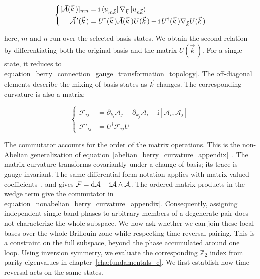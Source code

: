 \begin{equation}
\left\{\begin{aligned}
    [\vec{\mathcal{A}}(\vec{k}\,)]_{mn}
    &=\mathrm{i}\bra{u_{m\vec{k}}}\nabla_{\vec{k}}\ket{u_{n\vec{k}}} \\
    \vec{\mathcal{A}}\,'(\vec{k}\,)
    &=U^\dagger(\vec{k}\,)\vec{\mathcal{A}}(\vec{k}\,)U(\vec{k}\,)
    +\mathrm{i}\,U^\dagger(\vec{k}\,)\nabla_{\vec{k}}U(\vec{k}\,)
\end{aligned}\right.
\label{band_subspace_connection_topology}
\end{equation}

here, $m$ and $n$ run over the selected basis states.
We obtain the second relation by differentiating both the original basis and the matrix $U(\vec{k}\,)$.
For a single state, it reduces to equation~\eqref{berry_connection_gauge_transformation_topology}.
The off-diagonal elements describe the mixing of basis states as $\vec{k}$ changes.
The corresponding curvature is also a matrix:

\begin{equation}
\left\{\begin{aligned}
    \mathcal{F}_{ij}
    &=\partial_{k_i}\mathcal{A}_j-\partial_{k_j}\mathcal{A}_i
    -\mathrm{i}[\mathcal{A}_i,\mathcal{A}_j] \\
    \mathcal{F}'_{ij}&=U^\dagger\mathcal{F}_{ij}U
\end{aligned}\right.
\label{nonabelian_berry_curvature_appendix}
\end{equation}

The commutator accounts for the order of the matrix operations.
This is the non-Abelian generalization of equation~\eqref{abelian_berry_curvature_appendix}~\cite{wilczek1984appearance,xiao2010berry}.
The matrix curvature transforms covariantly under a change of basis; its trace is gauge invariant.
The same differential-form notation applies with matrix-valued coefficients~\cite{hassani2013mathematical}, and gives
$\mathcal{F}=\mathrm{d}\mathcal{A}-\mathrm{i}\mathcal{A}\wedge\mathcal{A}$.
The ordered matrix products in the wedge term give the commutator in equation~\eqref{nonabelian_berry_curvature_appendix}.
Consequently, assigning independent single-band phases to arbitrary members of a degenerate pair does not characterize the whole subspace.
We now ask whether we can join these local bases over the whole Brillouin zone
while respecting time-reversal pairing.
This is a constraint on the full subspace, beyond the phase accumulated around one loop.
Using inversion symmetry, we evaluate the corresponding $\mathbb{Z}_2$ index from parity eigenvalues in chapter~\ref{cha:fundamentals_c}.
We first establish how time reversal acts on the same states.

